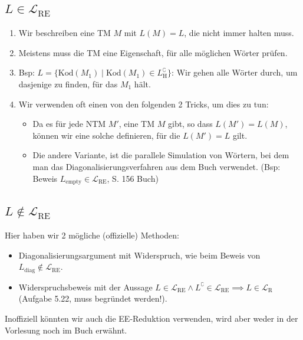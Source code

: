 \documentclass[a4paper, 11pt]{article}
\def\L{\mathcal{L}}
\begin{document}
                    \subsection{$L \in \L_{\text{RE}}$}
                    \begin{enumerate}[label=\Roman*.]
                        \item  Wir beschreiben eine TM $M$ mit $L(M) = L$, die nicht immer halten muss. 
                        \item  Meistens muss die TM eine Eigenschaft, für alle möglichen Wörter prüfen. 
                        \item  Bsp: $L = \{\text{Kod}(M_1) \mid \text{Kod}(M_1) \in L_\text{H}^\complement\}$: Wir gehen alle Wörter durch, um dasjenige zu finden, für das $M_1$ hält.
                        \item  Wir verwenden oft einen von den folgenden 2 Tricks, um dies zu tun:
                        \begin{itemize}[label=-]
                            \item Da es für jede NTM $M'$, eine TM $M$ gibt, so dass $L(M') = L(M)$, können wir eine solche definieren, für die $L(M') = L$ gilt.
                            \item Die andere Variante, ist die parallele Simulation von Wörtern, bei dem man das Diagonalisierungsverfahren aus dem Buch verwendet. (Bsp: Beweis $L_{\text{empty}} \in \L_{\text{RE}}$, S. 156 Buch)
                        \end{itemize}
                    \end{enumerate}
                
                    \subsection{$L \notin \L_{\text{RE}}$}
                        Hier haben wir 2 mögliche (offizielle) Methoden:
                        \begin{itemize}[label=-]
                            \item Diagonalisierungsargument mit Widerspruch, wie beim Beweis von $L_{\text{diag}} \notin \L_{\text{RE}}$.
                            \item Widerspruchsbeweis mit der Aussage $L \in \L_{\text{RE}} \land L^\complement \in \L_{\text{RE}} \implies L \in \L_{\text{R}}$ (Aufgabe 5.22, muss begründet werden!).
                        \end{itemize}
                        Inoffiziell könnten wir auch die EE-Reduktion verwenden, wird aber weder in der Vorlesung noch im Buch erwähnt.
                    
\end{document}
